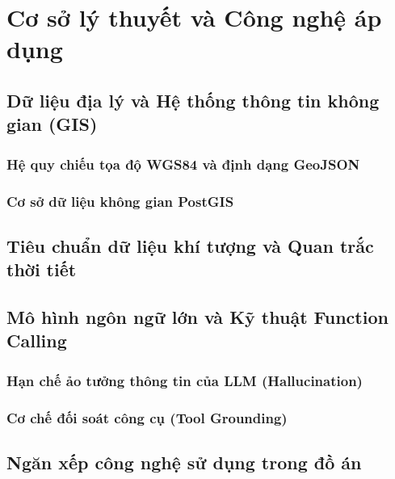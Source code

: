 \chapter{Cơ sở lý thuyết và Công nghệ áp dụng}
\label{ch:theory}

\section{Dữ liệu địa lý và Hệ thống thông tin không gian (GIS)}
\subsection{Hệ quy chiếu tọa độ WGS84 và định dạng GeoJSON}

\subsection{Cơ sở dữ liệu không gian PostGIS}

\section{Tiêu chuẩn dữ liệu khí tượng và Quan trắc thời tiết}

\section{Mô hình ngôn ngữ lớn và Kỹ thuật Function Calling}
\subsection{Hạn chế ảo tưởng thông tin của LLM (Hallucination)}

\subsection{Cơ chế đối soát công cụ (Tool Grounding)}

\section{Ngăn xếp công nghệ sử dụng trong đồ án}

